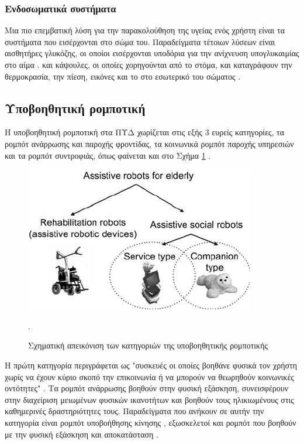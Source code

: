 \subsubsection{Ενδοσωματικά συστήματα}
Μια πιο επεμβατική λύση για την παρακολούθηση της υγείας ενός χρήστη είναι τα συστήματα που εισέρχονται στο σώμα του.
Παραδείγματα τέτοιων λύσεων είναι αισθητήρες γλυκόζης, οι οποίοι εισέρχονται υποδόρια για την ανίχνευση υπογλυκαιμίας στο αίμα \cite{Juhl2010}.
και κάψουλες, οι οποίες χορηγούνται από το στόμα, και καταγράφουν την θερμοκρασία, την πίεση, εικόνες και το  στο εσωτερικό του σώματος \cite{McCaffrey2008}.
\subsection{Υποβοηθητική ρομποτική}
Η υποβοηθητική ρομποτική στα ΠΥΔ χωρίζεται στις εξής 3 ευρείς κατηγορίες, τα ρομπότ ανάρρωσης και παροχής φροντίδας, τα κοινωνικά ρομπότ παροχής υπηρεσιών και τα ρομπότ συντροφιάς, όπως φαίνεται και στο Σχήμα \ref{robot_start} \cite{Broekens2009}\cite{Robinson2014}.
\begin{figure}[h!]
\centering
\includegraphics[scale=0.6]{images/robotics_start.png}
\caption{Σχηματική απεικόνιση των κατηγοριών της υποβοηθητικής ρομποτικής}.
\label{robot_start}
\end{figure}
Η πρώτη κατηγορία περιγράφεται ως "συσκευές οι οποίες βοηθάνε φυσικά τον χρήστη χωρίς να έχουν κύριο σκοπό την επικοινωνία ή να μπορούν να θεωρηθούν κοινωνικές οντότητες" \cite{Robinson2014}.
Τα ρομπότ ανάρρωσης βοηθούν στην φυσική εξάσκηση, συνεισφέρουν στην διαχείριση μειωμένων φυσικών
ικανοτήτων και βοηθούν τους ηλικιωμένους στις καθημερινές δραστηριότητες τους.
Παραδείγματα που ανήκουν σε αυτήν την κατηγορία είναι ρομπότ υποβοήθησης κίνησης \cite{Spenko2006}, εξωσκελετοί \cite{OSullivan2015} και ρομπότ που βοηθούν με την φυσική εξάσκηση και αποκατάσταση \cite{Johnson2006}.
\par
